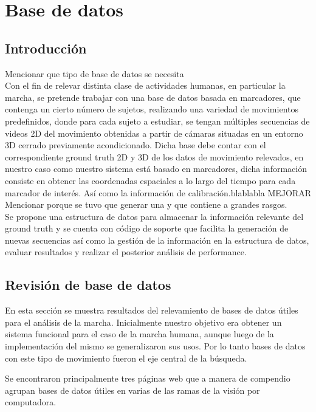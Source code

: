 \section{Base de datos}


\subsection{Introducción}
\label{}
Mencionar que tipo de base de datos se necesita\\
Con el fin de relevar distinta clase de actividades humanas, en particular la marcha, se pretende trabajar con una base de datos basada en marcadores, que contenga un cierto número de sujetos, realizando una variedad de movimientos predefinidos, donde para cada sujeto a estudiar, se tengan múltiples secuencias de videos 2D del movimiento obtenidas a partir de cámaras situadas en un entorno 3D cerrado previamente acondicionado. Dicha base debe contar con el correspondiente ground truth 2D y 3D de los datos de movimiento relevados, en nuestro caso como nuestro sistema está basado en marcadores, dicha información consiste en obtener las coordenadas espaciales a lo largo del tiempo para cada marcador de interés. Así como la información de calibración.blablabla MEJORAR \\

Mencionar porque se tuvo que generar una y que contiene a grandes rasgos.\\
Se propone una estructura de datos para almacenar la información relevante del ground truth y  se cuenta con código de soporte que facilita la generación de nuevas secuencias así como la gestión de la información en la estructura de datos, evaluar resultados y realizar el  posterior análisis de performance.

\subsection{Revisión de base de datos}
\label{}
En esta sección se muestra  resultados del relevamiento de bases de datos útiles para el análisis de la marcha.
Inicialmente nuestro objetivo era obtener un sistema funcional para el caso de la marcha humana, aunque luego de la implementación del mismo se generalizaron sus usos. Por lo tanto bases de datos con este tipo de movimiento fueron el eje central de la búsqueda.

Se encontraron principalmente tres páginas web que a manera de compendio agrupan  bases de datos útiles en varias de las ramas de la visión por computadora.

